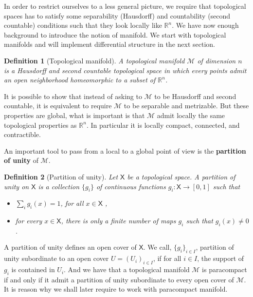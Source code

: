 \documentclass[10pt]{book}
\newcommand{\Mcal}{\mathcal{M}}
\newcommand{\Rbb}{\mathbb{R}}
\newcommand{\Xsf}{\mathsf{X}}
\theoremstyle{break}
\newtheorem{definition}{Definition}
\begin{document}
In order to restrict ourselves to a less general picture, we require that topological spaces has to satisfy some separability (Hausdorff) and countability (second countable) conditions such that they look locally like $\Rbb^n$. We have now enough background to introduce the notion of manifold. We start with topological manifolds and will implement differential structure in the next section.%


\begin{definition}[Topological manifold]
A topological manifold $\Mcal$ of dimension $n$ is a Hausdorff and second countable topological space in which every points admit an open neighborhood homeomorphic to a subset of $\Rbb^n$.
\end{definition}


It is possible to show that instead of asking to $\Mcal$ to be Hausdorff and second countable, it is equivalent to require $\Mcal$ to be separable and metrizable. But these properties are global, what is important is that $\Mcal$ admit locally the same topological properties as $\Rbb^n$. In particular it is locally compact, connected, and contractible.%


\bigskip


An important tool to pass from a local to a global point of view is the \textbf{partition of unity} of $\Mcal$. 


\begin{definition}[Partition of unity]


Let $\Xsf$ be a topological space. A partition of unity on $\Xsf$ is a collection $\{g_i\}$ of continuous functions $g_i : \Xsf \to [0,1]$ such that
%
\begin{itemize}
\item $\sum_i g_i(x) = 1$, for all $x \in \Xsf$ ,
\item for every $x \in \Xsf$, there is only a finite number of maps $g_i$ such that $g_i(x) \neq 0$.
\end{itemize}
%
\end{definition}


A partition of unity defines an open cover of $\Xsf$. We call, $\{g_i\}_{i \in I}$, partition of unity subordinate to an open cover $U=(U_i)_{i \in I}$, if for all $i \in I$, the support of $g_i$ is contained in $U_i$. And we have that a topological manifold $\Mcal$ is paracompact if and only if it admit a partition of unity subordinate to every open cover of $\Mcal$. It is reason why we shall later require to work with paracompact manifold.
\end{document}
